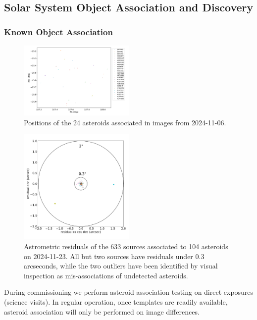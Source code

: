 \clearpage

\subsection{Solar System Object Association and Discovery}
\label{sec:dia_solar_system}

\subsubsection{Known Object Association}
\label{sec:association}

\begin{figure}
  \centering
  \includegraphics[width=0.5\textwidth]{sso_figures/24_asteroids.pdf}
  \caption{Positions of the 24 asteroids associated in images from 2024-11-06.}
  \label{fig:solar_system_positions}
\end{figure}

\begin{figure}
  \centering
  \includegraphics[width=0.5\textwidth]{sso_figures/sso_residuals.pdf}
  \caption{Astrometric residuals of the 633 sources associated to 104 asteroids on 2024-11-23. All but two sources have residuals under 0.3 arcseconds, while the two outliers have been identified by visual inspection as mis-associations of undetected asteroids.}
  \label{fig:solar_system_residuals}
\end{figure}

During commissioning we perform asteroid association testing on direct
exposures (science visits). In regular operation, once templates are
readily available, asteroid association will only be performed on image
differences.

